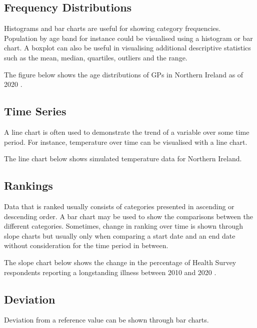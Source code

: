 \documentclass[
]{book}
\begin{document}
\hypertarget{frequency-distributions}{%
\subsection{Frequency Distributions}\label{frequency-distributions}}

Histograms and bar charts are useful for showing category frequencies. Population by age band for instance could be visualised using a histogram or bar chart. A boxplot can also be useful in visualising additional descriptive statistics such as the mean, median, quartiles, outliers and the range.

The figure below shows the age distributions of GPs in Northern Ireland as of 2020 \citep{family}.

\hypertarget{time-series}{%
\subsection{Time Series}\label{time-series}}

A line chart is often used to demonstrate the trend of a variable over some time period. For instance, temperature over time can be visualised with a line chart.

The line chart below shows simulated temperature data for Northern Ireland.

\hypertarget{rankings}{%
\subsection{Rankings}\label{rankings}}

Data that is ranked usually consists of categories presented in ascending or descending order. A bar chart may be used to show the comparisons between the different categories. Sometimes, change in ranking over time is shown through slope charts but usually only when comparing a start date and an end date without consideration for the time period in between.

The slope chart below shows the change in the percentage of Health Survey respondents reporting a longstanding illness between 2010 and 2020 \citep{health}.

\hypertarget{deviation}{%
\subsection{Deviation}\label{deviation}}

Deviation from a reference value can be shown through bar charts.
\end{document}
